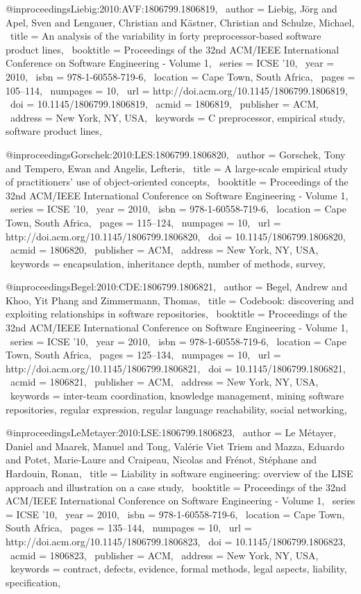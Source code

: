 @inproceedings{Liebig:2010:AVF:1806799.1806819,
 author = {Liebig, J\"{o}rg and Apel, Sven and Lengauer, Christian and K\"{a}stner, Christian and Schulze, Michael},
 title = {An analysis of the variability in forty preprocessor-based software product lines},
 booktitle = {Proceedings of the 32nd ACM/IEEE International Conference on Software Engineering - Volume 1},
 series = {ICSE '10},
 year = {2010},
 isbn = {978-1-60558-719-6},
 location = {Cape Town, South Africa},
 pages = {105--114},
 numpages = {10},
 url = {http://doi.acm.org/10.1145/1806799.1806819},
 doi = {10.1145/1806799.1806819},
 acmid = {1806819},
 publisher = {ACM},
 address = {New York, NY, USA},
 keywords = {C preprocessor, empirical study, software product lines},
} 

@inproceedings{Gorschek:2010:LES:1806799.1806820,
 author = {Gorschek, Tony and Tempero, Ewan and Angelis, Lefteris},
 title = {A large-scale empirical study of practitioners' use of object-oriented concepts},
 booktitle = {Proceedings of the 32nd ACM/IEEE International Conference on Software Engineering - Volume 1},
 series = {ICSE '10},
 year = {2010},
 isbn = {978-1-60558-719-6},
 location = {Cape Town, South Africa},
 pages = {115--124},
 numpages = {10},
 url = {http://doi.acm.org/10.1145/1806799.1806820},
 doi = {10.1145/1806799.1806820},
 acmid = {1806820},
 publisher = {ACM},
 address = {New York, NY, USA},
 keywords = {encapsulation, inheritance depth, number of methods, survey},
} 

@inproceedings{Begel:2010:CDE:1806799.1806821,
 author = {Begel, Andrew and Khoo, Yit Phang and Zimmermann, Thomas},
 title = {Codebook: discovering and exploiting relationships in software repositories},
 booktitle = {Proceedings of the 32nd ACM/IEEE International Conference on Software Engineering - Volume 1},
 series = {ICSE '10},
 year = {2010},
 isbn = {978-1-60558-719-6},
 location = {Cape Town, South Africa},
 pages = {125--134},
 numpages = {10},
 url = {http://doi.acm.org/10.1145/1806799.1806821},
 doi = {10.1145/1806799.1806821},
 acmid = {1806821},
 publisher = {ACM},
 address = {New York, NY, USA},
 keywords = {inter-team coordination, knowledge management, mining software repositories, regular expression, regular language reachability, social networking},
} 

@inproceedings{LeMetayer:2010:LSE:1806799.1806823,
 author = {Le M{\'e}tayer, Daniel and Maarek, Manuel and Tong, Val{\'e}rie Viet Triem and Mazza, Eduardo and Potet, Marie-Laure and Craipeau, Nicolas and Fr{\'e}not, St{\'e}phane and Hardouin, Ronan},
 title = {Liability in software engineering: overview of the LISE approach and illustration on a case study},
 booktitle = {Proceedings of the 32nd ACM/IEEE International Conference on Software Engineering - Volume 1},
 series = {ICSE '10},
 year = {2010},
 isbn = {978-1-60558-719-6},
 location = {Cape Town, South Africa},
 pages = {135--144},
 numpages = {10},
 url = {http://doi.acm.org/10.1145/1806799.1806823},
 doi = {10.1145/1806799.1806823},
 acmid = {1806823},
 publisher = {ACM},
 address = {New York, NY, USA},
 keywords = {contract, defects, evidence, formal methods, legal aspects, liability, specification},
} 

